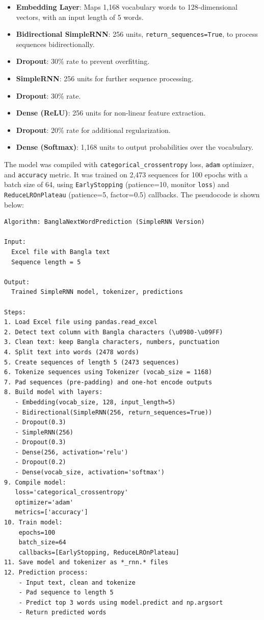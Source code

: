 \documentclass[12pt]{article}
\begin{document}
\begin{itemize}
    \item \textbf{Embedding Layer}: Maps 1,168 vocabulary words to 128-dimensional vectors, with an input length of 5 words.
    \item \textbf{Bidirectional SimpleRNN}: 256 units, \texttt{return\_sequences=True}, to process sequences bidirectionally.
    \item \textbf{Dropout}: 30\% rate to prevent overfitting.
    \item \textbf{SimpleRNN}: 256 units for further sequence processing.
    \item \textbf{Dropout}: 30\% rate.
    \item \textbf{Dense (ReLU)}: 256 units for non-linear feature extraction.
    \item \textbf{Dropout}: 20\% rate for additional regularization.
    \item \textbf{Dense (Softmax)}: 1,168 units to output probabilities over the vocabulary.
\end{itemize}

The model was compiled with \texttt{categorical\_crossentropy} loss, \texttt{adam} optimizer, and \texttt{accuracy} metric. It was trained on 2,473 sequences for 100 epochs with a batch size of 64, using \texttt{EarlyStopping} (patience=10, monitor \texttt{loss}) and \texttt{ReduceLROnPlateau} (patience=5, factor=0.5) callbacks. The pseudocode is shown below:

\begin{lstlisting}
Algorithm: BanglaNextWordPrediction (SimpleRNN Version)

Input: 
  Excel file with Bangla text
  Sequence length = 5

Output: 
  Trained SimpleRNN model, tokenizer, predictions

Steps:
1. Load Excel file using pandas.read_excel
2. Detect text column with Bangla characters (\u0980-\u09FF)
3. Clean text: keep Bangla characters, numbers, punctuation
4. Split text into words (2478 words)
5. Create sequences of length 5 (2473 sequences)
6. Tokenize sequences using Tokenizer (vocab_size = 1168)
7. Pad sequences (pre-padding) and one-hot encode outputs
8. Build model with layers:
   - Embedding(vocab_size, 128, input_length=5)
   - Bidirectional(SimpleRNN(256, return_sequences=True))
   - Dropout(0.3)
   - SimpleRNN(256)
   - Dropout(0.3)
   - Dense(256, activation='relu')
   - Dropout(0.2)
   - Dense(vocab_size, activation='softmax')
9. Compile model: 
   loss='categorical_crossentropy'
   optimizer='adam'
   metrics=['accuracy']
10. Train model: 
    epochs=100
    batch_size=64
    callbacks=[EarlyStopping, ReduceLROnPlateau]
11. Save model and tokenizer as *_rnn.* files
12. Prediction process:
    - Input text, clean and tokenize
    - Pad sequence to length 5
    - Predict top 3 words using model.predict and np.argsort
    - Return predicted words
\end{lstlisting}
\end{document}
